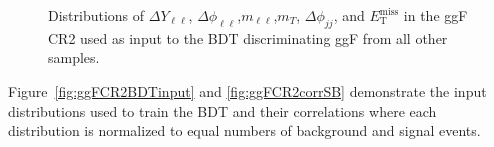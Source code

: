\begin{figure}[!h]
  \hfill
{\caption{Distributions of $\Delta Y_{\ell\ell}$, $\Delta \phi_{\ell\ell}$,$m_{\ell\ell}$,$m_T$, $\Delta \phi_{jj}$, and $\ensuremath{E_{\text{T}}^{\text{miss}}}$ in the ggF CR2 used as input to the BDT discriminating ggF from all other samples.
\label{fig:ggFCR2}}}
\end{figure} 

Figure~\ref{fig:ggFCR2BDTinput} and \ref{fig:ggFCR2corrSB} demonstrate the input distributions used to train the BDT and their correlations where each distribution is normalized to equal numbers of background and signal events.

